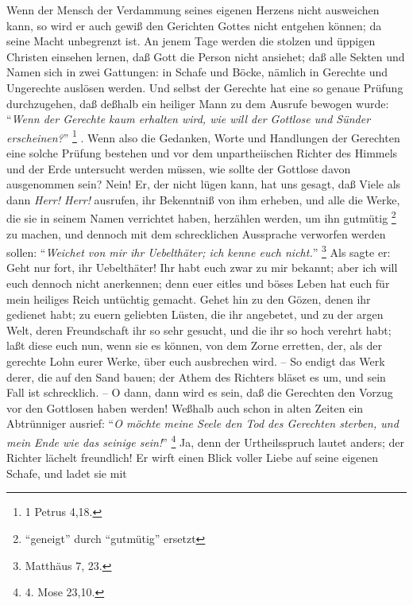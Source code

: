 Wenn der Mensch der Verdammung seines eigenen Herzens nicht ausweichen kann, so
wird er auch gewiß den Gerichten Gottes nicht entgehen können;
da seine Macht unbegrenzt ist. 
An jenem Tage werden die stolzen und üppigen Christen einsehen lernen, daß Gott
die Person nicht ansiehet;
daß alle Sekten und Namen sich in zwei Gattungen: 
in Schafe und Böcke, nämlich in Gerechte und Ungerechte auslösen werden.
Und selbst der Gerechte hat eine so genaue Prüfung durchzugehen, daß deßhalb ein
heiliger Mann zu dem Ausrufe bewogen wurde: "`\textit{Wenn der Gerechte kaum
erhalten wird, wie will der Gottlose und Sünder erscheinen?}"' \footnote{1
Petrus 4,18.} .
Wenn also die Gedanken, Worte und Handlungen der Gerechten eine solche Prüfung
bestehen und vor dem unpartheiischen Richter des Himmels und der Erde untersucht
werden müssen, wie sollte der Gottlose davon ausgenommen sein?
Nein!
Er, der nicht lügen kann, hat uns gesagt, daß Viele als dann \textit{Herr!
Herr!} ausrufen, ihr Bekenntniß von ihm erheben, und alle die Werke, die sie in
seinem Namen verrichtet haben, herzählen werden, um ihn gutmütig
\footnote{"`geneigt"' durch "`gutmütig"' ersetzt} zu machen, und dennoch mit dem
schrecklichen Aussprache verworfen werden sollen:
"`\textit{Weichet von mir ihr Uebelthäter; ich kenne euch nicht.}"'
\footnote{Matthäus 7, 23.} 
Als sagte er:
Geht nur fort, ihr Uebelthäter!
Ihr habt euch zwar zu mir bekannt;
aber ich will euch dennoch nicht anerkennen;
denn euer eitles und böses Leben hat euch für mein heiliges Reich untüchtig
gemacht.
Gehet hin zu den Gözen, denen ihr gedienet habt;
zu euern geliebten Lüsten, die ihr angebetet, und zu der argen Welt, deren
Freundschaft ihr so sehr gesucht, und die ihr so hoch verehrt habt;
laßt diese euch nun, wenn sie es können, von dem Zorne erretten, der, als der
gerechte Lohn eurer Werke, über euch ausbrechen wird.
-- So endigt das Werk derer, die auf den Sand bauen;
der Athem des Richters bläset es um, und sein Fall ist schrecklich.
-- O dann, dann wird es sein, daß die Gerechten den Vorzug vor den Gottlosen
haben werden!
Weßhalb auch schon in alten Zeiten ein Abtrünniger ausrief:
"`\textit{O möchte meine Seele den Tod des Gerechten sterben, und mein Ende wie
das seinige sein!}"' \footnote{4. Mose 23,10.} 
Ja, denn der Urtheilsspruch lautet anders;
der Richter lächelt freundlich!
Er wirft einen Blick voller Liebe auf seine eigenen Schafe, und ladet sie mit
